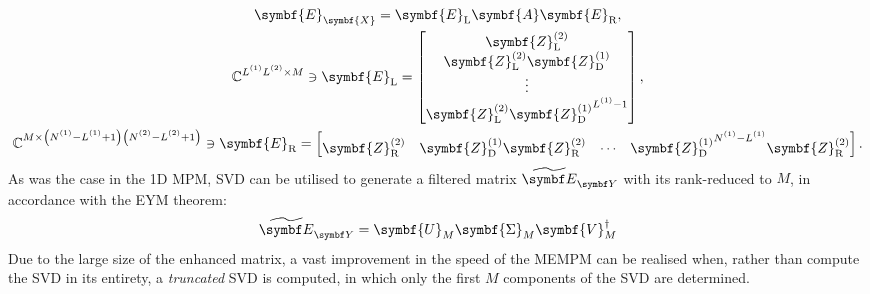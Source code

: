 \begin{subequations}
    \begin{gather}
        \symbf{E}_{\symbf{X}} =
        \symbf{E}_{\text{L}}
        \symbf{A}
        \symbf{E}_{\text{R}},\\
        \mathbb{C}^{\Lone \Ltwo \times M} \ni
        \symbf{E}_{\text{L}} =
        \begin{bmatrix}
            \symbf{Z}^{(2)}_{\text{L}} \\
            \symbf{Z}^{(2)}_{\text{L}} \symbf{Z}^{(1)}_{\text{D}} \\
            \vdots \\
            \symbf{Z}^{(2)}_{\text{L}} {\symbf{Z}^{(1)}_{\text{D}}}^{\Lone - 1} \\
        \end{bmatrix},\label{eq:EL}\\
        \mathbb{C}^{M \times \left(\None - \Lone + 1\right)\left(\Ntwo - \Ltwo + 1\right)} \ni
        \symbf{E}_{\text{R}} =
        \begin{bmatrix}
            \symbf{Z}^{(2)}_{\text{R}} &
            \symbf{Z}^{(1)}_{\text{D}} \symbf{Z}^{(2)}_{\text{R}} &
            \cdots &
            {\symbf{Z}^{(1)}_{\text{D}}}^{\None - \Lone} \symbf{Z}^{(2)}_{\text{R}} \\
        \end{bmatrix}.
    \end{gather}
\end{subequations}
As was the case in the \ac{1D} \ac{MPM}, \ac{SVD} can be utilised to generate a
filtered matrix $\EYtilde$ with its rank-reduced to $M$, in accordance with the
\ac{EYM} theorem:
\begin{equation}
    \EYtilde =
        \symbf{U}_M^{\vphantom{\dagger}}
        \symbf{\Sigma}_M^{\vphantom{\dagger}}
        \symbf{V}_M^{\dagger}
\end{equation}
Due to the large size of the enhanced matrix, a vast improvement
in the speed of the \ac{MEMPM} can be realised when, rather than compute the
\ac{SVD} in its entirety, a \emph{truncated} \ac{SVD} is computed, in
which only the first $M$ components of the \ac{SVD} are
determined\cite{Baglama2005}.

